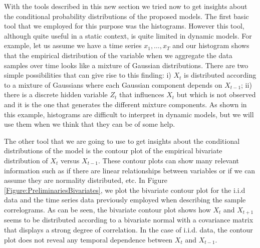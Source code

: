 With the tools described in this new section we tried now to get insights about the conditional probability distributions of the proposed models. The first basic tool that we employed for this purpose was the histograms. However this tool, although quite useful in a static context, is quite limited in dynamic models. For example, let us assume we have a time series $x_1,\ldots, x_T$ and our histogram shows that the empirical distribution of the variable when we aggregate the data samples over time looks like a mixture of Gaussian distributions. There are two simple possibilities that can give rise to this finding: i)  $X_t$ is distributed according to a mixture of Gaussians where each Gaussian component depends on $X_{t-1}$; ii) there is a discrete hidden variable $Z_t$ that influences $X_{t}$ but which is not observed and it is the one that generates the different mixture components.  As shown in this example, histograms are difficult to interpret in dynamic models, but we will use them when we think that they can be of some help. 

The other tool that we are going to use to get insights about the conditional distributions of the model is the contour plot of the empirical bivariate distribution of $X_t$ versus $X_{t-1}$.  These contour plots can show many relevant information such as if there are linear relationships between variables or if we can assume they are normality distributed, etc. In Figure \ref{Figure:PreliminariesBivariates}, we plot the bivariate contour plot for the i.i.d data and the time series data previously employed when describing the sample correlograms. As can be seen, the bivariate contour plot shows how $X_t$ and $X_{t+1}$ seems to be distributed according to a bivariate normal with a covariance matrix that displays a strong degree of correlation. In the case of i.i.d. data, the contour plot does not reveal  any temporal dependence between $X_t$ and $X_{t-1}$. 

